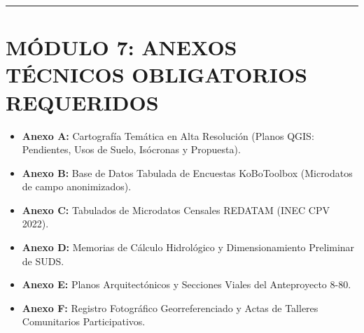\documentclass[
  letterpaper,
  DIV=11,
  numbers=noendperiod]{scrreprt}
\providecommand{\tightlist}{%
  \setlength{\itemsep}{0pt}\setlength{\parskip}{0pt}}
\begin{document}
\begin{center}\rule{0.5\linewidth}{0.5pt}\end{center}

\chapter{MÓDULO 7: ANEXOS TÉCNICOS OBLIGATORIOS
REQUERIDOS}\label{muxf3dulo-7-anexos-tuxe9cnicos-obligatorios-requeridos}

\begin{itemize}
\tightlist
\item
  \textbf{Anexo A:} Cartografía Temática en Alta Resolución (Planos
  QGIS: Pendientes, Usos de Suelo, Isócronas y Propuesta).
\item
  \textbf{Anexo B:} Base de Datos Tabulada de Encuestas KoBoToolbox
  (Microdatos de campo anonimizados).
\item
  \textbf{Anexo C:} Tabulados de Microdatos Censales REDATAM (INEC CPV
  2022).
\item
  \textbf{Anexo D:} Memorias de Cálculo Hidrológico y Dimensionamiento
  Preliminar de SUDS.
\item
  \textbf{Anexo E:} Planos Arquitectónicos y Secciones Viales del
  Anteproyecto 8-80.
\item
  \textbf{Anexo F:} Registro Fotográfico Georreferenciado y Actas de
  Talleres Comunitarios Participativos.
\end{itemize}
\end{document}
